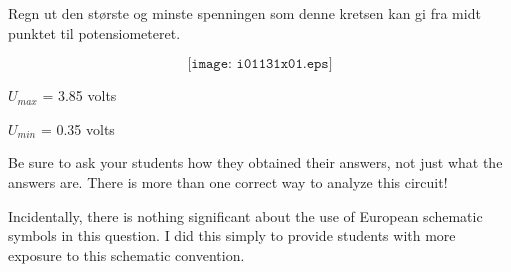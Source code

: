 

Regn ut den største og minste spenningen som denne kretsen kan gi fra midt punktet til potensiometeret. 

$$\texttt{[image: i01131x01.eps]}$$







$U_{max}$ = 3.85 volts

\vskip 10pt

$U_{min}$ = 0.35 volts







Be sure to ask your students how they obtained their answers, not just what the answers are.  There is more than one correct way to analyze this circuit!

Incidentally, there is nothing significant about the use of European schematic symbols in this question.  I did this simply to provide students with more exposure to this schematic convention.





